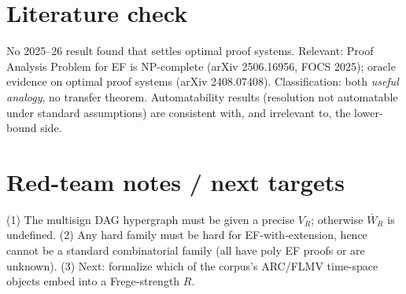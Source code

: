 \documentclass[11pt]{article}
\begin{document}
\section*{Literature check}
No 2025--26 result found that settles optimal proof systems. Relevant: Proof Analysis Problem for EF is NP-complete (arXiv 2506.16956, FOCS 2025); oracle evidence on optimal proof systems (arXiv 2408.07408). Classification: both \emph{useful analogy}, no transfer theorem. Automatability results (resolution not automatable under standard assumptions) are consistent with, and irrelevant to, the lower-bound side.

\section*{Red-team notes / next targets}
(1) The multisign DAG hypergraph must be given a precise $V_R$; otherwise $\overline W_R$ is undefined. (2) Any hard family must be hard for EF-with-extension, hence cannot be a standard combinatorial family (all have poly EF proofs or are unknown). (3) Next: formalize which of the corpus's ARC/FLMV time-space objects embed into a Frege-strength $R$.

\end{document}
